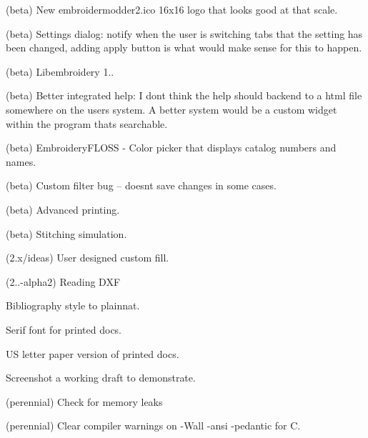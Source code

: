 \begin{DoxyRefList}
\label{todo__todo000169}%
%
(beta) New embroidermodder2.\+ico 16x16 logo that looks good at that scale.

\label{todo__todo000170}%
%
(beta) Settings dialog\+: notify when the user is switching tabs that the setting has been changed, adding apply button is what would make sense for this to happen.

\label{todo__todo000171}%
%
(beta) Libembroidery 1..

\label{todo__todo000172}%
%
(beta) Better integrated help\+: I don\textquotesingle{}t think the help should backend to a html file somewhere on the user\textquotesingle{}s system. A better system would be a custom widget within the program that\textquotesingle{}s searchable.

\label{todo__todo000173}%
%
(beta) Embroidery\+FLOSS -\/ Color picker that displays catalog numbers and names.

\label{todo__todo000174}%
%
(beta) Custom filter bug -- doesn\textquotesingle{}t save changes in some cases.

\label{todo__todo000175}%
%
(beta) Advanced printing.

\label{todo__todo000176}%
%
(beta) Stitching simulation.

\label{todo__todo000177}%
%
(2.\+x/ideas) User designed custom fill.

\label{todo__todo000028}%
%
(2..-\/alpha2) Reading DXF

\label{todo__todo000015}%
%
Bibliography style to plainnat.

\label{todo__todo000016}%
%
Serif font for printed docs.

\label{todo__todo000017}%
%
US letter paper version of printed docs.

\label{todo__todo000018}%
%
Screenshot a working draft to demonstrate.

\label{todo__todo000019}%
%
(perennial) Check for memory leaks 



(perennial) Clear compiler warnings on {\ttfamily -\/Wall -\/ansi -\/pedantic} for C. 




\end{DoxyRefList}
